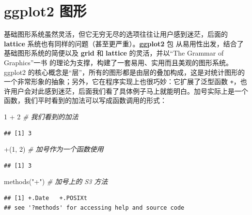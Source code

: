 \documentclass[
  b5paper,
  UTF8,twoside]{book}
\newenvironment{Shaded}{\begin{snugshade}}{\end{snugshade}}
\newcommand{\AttributeTok}[1]{\textcolor[rgb]{0.77,0.63,0.00}{#1}}
\newcommand{\CommentTok}[1]{\textcolor[rgb]{0.56,0.35,0.01}{\textit{#1}}}
\newcommand{\DecValTok}[1]{\textcolor[rgb]{0.00,0.00,0.81}{#1}}
\newcommand{\FunctionTok}[1]{\textcolor[rgb]{0.00,0.00,0.00}{#1}}
\newcommand{\NormalTok}[1]{#1}
\newcommand{\SpecialCharTok}[1]{\textcolor[rgb]{0.00,0.00,0.00}{#1}}
\newcommand{\StringTok}[1]{\textcolor[rgb]{0.31,0.60,0.02}{#1}}
\begin{document}
\hypertarget{sec:ggplot2}{%
\section{ggplot2 图形}\label{sec:ggplot2}}

基础图形系统虽然灵活，但它无穷无尽的选项往往让用户感到迷茫，后面的 \textbf{lattice} 系统也有同样的问题（甚至更严重）。\textbf{ggplot2} 包 \citep{ggplot2} 从易用性出发，结合了基础图形系统的简便以及 \textbf{grid} 和 \textbf{lattice} 的灵活，并以``The Grammar of Graphics''一书 \citep{Wilkinson05} 的理论为支撑，构建了一套易用、实用而且美观的图形系统。ggplot2 的核心概念是``层''，所有的图形都是由层的叠加构成，这是对统计图形的一个非常形象的抽象；另外，它在程序实现上也很巧妙：它扩展了泛型函数 \texttt{+}，也许用户会对此感到迷茫，后面我们看了具体例子马上就能明白。加号实际上是一个函数，我们平时看到的加法可以写成函数调用的形式：

\begin{Shaded}
\begin{Highlighting}[]
\DecValTok{1} \SpecialCharTok{+} \DecValTok{2} \CommentTok{\# 我们看到的加法}
\end{Highlighting}
\end{Shaded}

\begin{verbatim}
## [1] 3
\end{verbatim}

\begin{Shaded}
\begin{Highlighting}[]
\StringTok{\textasciigrave{}}\AttributeTok{+}\StringTok{\textasciigrave{}}\NormalTok{(}\DecValTok{1}\NormalTok{, }\DecValTok{2}\NormalTok{) }\CommentTok{\# 加号作为一个函数使用}
\end{Highlighting}
\end{Shaded}

\begin{verbatim}
## [1] 3
\end{verbatim}

\begin{Shaded}
\begin{Highlighting}[]
\FunctionTok{methods}\NormalTok{(}\StringTok{"+"}\NormalTok{) }\CommentTok{\# 加号上的 S3 方法}
\end{Highlighting}
\end{Shaded}

\begin{verbatim}
## [1] +.Date   +.POSIXt
## see '?methods' for accessing help and source code
\end{verbatim}
\end{document}
